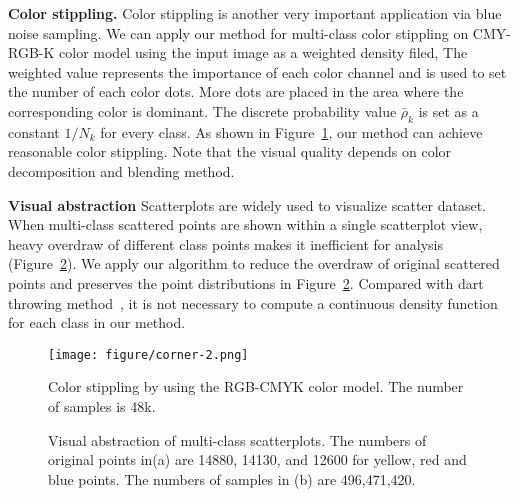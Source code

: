 \textbf{Color stippling.}
Color stippling is another very important application via blue noise sampling.
We can apply our method for multi-class color stippling on CMY-RGB-K color model using the input image as a weighted density filed,
The weighted value represents the importance of each color channel and is used to set the number of each color dots.
More dots are placed in the
area where the corresponding color is dominant.
The discrete probability value $\bar\rho_k$ is set as a constant $1/N_k$ for every class.
As shown in Figure~\ref{Color stippling},
our method can achieve reasonable color stippling.
Note that the visual quality depends on color decomposition and blending method.

\textbf{Visual abstraction}
Scatterplots are widely used to visualize scatter dataset.
When multi-class scattered points are shown within a single scatterplot view, heavy overdraw of different class points makes it inefficient for analysis (Figure~\ref{visual-abstraction}).
We apply our algorithm to reduce the overdraw of original scattered points and preserves the point distributions in Figure~\ref{visual-abstraction}.
Compared with dart throwing method~\cite{wei:2010:multi,chen:2014:visual},
it is not necessary to compute a continuous density function for each class in our method.



\begin{figure}[htb]
  \centering
    \texttt{[image: figure/corner-2.png]}
   \caption{Color stippling by using the RGB-CMYK color model.
  The number of samples is 48k.  }\label{Color stippling}
\end{figure}

\begin{figure}[htb]
  \centering

  \caption{Visual abstraction of multi-class scatterplots.
   The numbers of original points in(a) are 14880, 14130, and 12600 for yellow, red and blue points.
   The numbers of samples in (b) are 496,471,420.}
   \label{visual-abstraction}
\end{figure}


